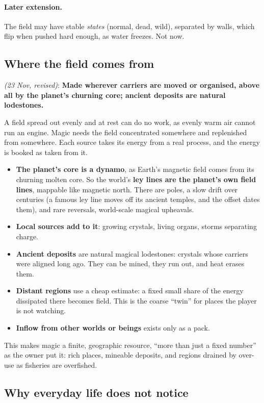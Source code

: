 \documentclass[11pt,a4paper]{article}
\newcommand{\decision}[3]{\par\smallskip\noindent{\color{dec}\textbf{Decision #1}} \textit{(#2)}: \textbf{#3}\par}
\begin{document}
\paragraph{Later extension.} The field may have stable \emph{states} (normal, dead, wild), separated by walls, which flip when pushed hard enough, as water freezes. Not now.

\subsection{Where the field comes from}

\decision{Q1.2}{23 Nov, revised}{Made wherever carriers are moved or organised, above all by the planet's churning core; ancient deposits are natural lodestones.}

A field spread out evenly and at rest can do no work, as evenly warm air cannot run an engine. Magic needs the field concentrated somewhere and replenished from somewhere. Each source takes its energy from a real process, and the energy is booked as taken from it.
\begin{itemize}
  \item \textbf{The planet's core is a dynamo}, as Earth's magnetic field comes from its churning molten core. So the world's \textbf{ley lines are the planet's own field lines}, mappable like magnetic north. There are poles, a slow drift over centuries (a famous ley line moves off its ancient temples, and the offset dates them), and rare reversals, world-scale magical upheavals.
  \item \textbf{Local sources add to it}: growing crystals, living organs, storms separating charge.
  \item \textbf{Ancient deposits} are natural magical lodestones: crystals whose carriers were aligned long ago. They can be mined, they run out, and heat erases them.
  \item \textbf{Distant regions} use a cheap estimate: a fixed small share of the energy dissipated there becomes field. This is the coarse ``twin'' for places the player is not watching.
  \item \textbf{Inflow from other worlds or beings} exists only as a pack.
\end{itemize}
This makes magic a finite, geographic resource, ``more than just a fixed number'' as the owner put it: rich places, mineable deposits, and regions drained by over-use as fisheries are overfished.

\subsection{Why everyday life does not notice}
\end{document}
